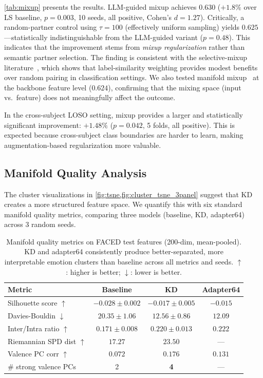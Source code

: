 \cref{tab:mixup} presents the results. LLM-guided mixup achieves $0.630$ ($+1.8\%$ over LS baseline, $p = 0.003$, 10 seeds, all positive, Cohen's $d = 1.27$). Critically, a random-partner control using $\tau = 100$ (effectively uniform sampling) yields $0.625$---statistically indistinguishable from the LLM-guided variant ($p = 0.48$). This indicates that the improvement stems from \emph{mixup regularization} rather than semantic partner selection. The finding is consistent with the selective-mixup literature~\cite{yao2022cmixup}, which shows that label-similarity weighting provides modest benefits over random pairing in classification settings. We also tested manifold mixup~\cite{verma2019manifold} at the backbone feature level ($0.624$), confirming that the mixing space (input vs.\ feature) does not meaningfully affect the outcome.

In the cross-subject LOSO setting, mixup provides a larger and statistically significant improvement: $+1.48\%$ ($p = 0.042$, 5 folds, all positive). This is expected because cross-subject class boundaries are harder to learn, making augmentation-based regularization more valuable.

\subsection{Manifold Quality Analysis}
\label{sec:manifold}
\vspace{-1mm}

The cluster visualizations in \cref{fig:tsne,fig:cluster_tsne_3panel} suggest that KD creates a more structured feature space. We quantify this with six standard manifold quality metrics, comparing three models (baseline, KD, adapter64) across 3 random seeds.

\begin{table}[!t]
\caption{Manifold quality metrics on FACED test features (200-dim, mean-pooled). KD and adapter64 consistently produce better-separated, more interpretable emotion clusters than baseline across all metrics and seeds. $\uparrow$: higher is better; $\downarrow$: lower is better.}
\small
\centering
\begin{tabular}{lccc}
\toprule
Metric & Baseline & KD & Adapter64 \\
\midrule
Silhouette score $\uparrow$ & $-0.028 \pm 0.002$ & $\mathbf{-0.017 \pm 0.005}$ & $-0.015$ \\
Davies-Bouldin $\downarrow$ & $20.35 \pm 1.06$ & $\mathbf{12.56 \pm 0.86}$ & $12.09$ \\
Inter/Intra ratio $\uparrow$ & $0.171 \pm 0.008$ & $\mathbf{0.220 \pm 0.013}$ & $0.222$ \\
Riemannian SPD dist $\uparrow$ & $17.27$ & $\mathbf{23.50}$ & --- \\
Valence PC corr $\uparrow$ & $0.072$ & $\mathbf{0.176}$ & $0.131$ \\
\# strong valence PCs & 2 & \textbf{4} & --- \\
\bottomrule
\end{tabular}
\label{tab:manifold}
\end{table}

